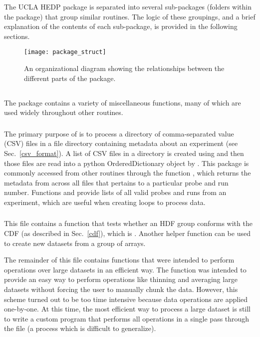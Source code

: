 The UCLA HEDP package is separated into several sub-packages (folders within the package) that group similar routines. The logic of these groupings, and a brief explanation of the contents of each sub-package, is provided in the following sections.

\begin{figure}[h]
\centering
\texttt{[image: package\_struct]}
\caption[Package Structure]
{\label{package_struct} An organizational diagram showing the relationships between the different parts of the package.}
\end{figure}


\subsection{}

The  package contains a variety of miscellaneous functions, many of which are used widely throughout other routines.
\subsubsection{}

The primary purpose of  is to process a directory of comma-separated value (CSV) files in a file directory containing metadata about an experiment (see Sec.~\ref{csv_format}).  A list of CSV files in a directory is created using  and then those files are read into a python OrderedDictionary object by . This package is commonly accessed from other routines through the function , which returns the metadata from across all files that pertains to a particular probe and run number. Functions  and  provide lists of all valid probes and runs from an experiment, which are useful when creating loops to process data.


\subsubsection{}

This file contains a function that tests whether an HDF group conforms with the CDF (as described in Sec.~\ref{cdf}), which is . Another helper function  can be used to create new datasets from a group of arrays.

The remainder of this file contains functions that were intended to perform operations over large datasets in an efficient way. The function  was intended to provide an easy way to perform operations like thinning and averaging large datasets without forcing the user to manually chunk the data. However, this scheme turned out to be too time intensive because data operations are applied one-by-one. At this time, the most efficient way to process a large dataset is still to write a custom program that performs all operations in a single pass through the file (a process which is difficult to generalize).

